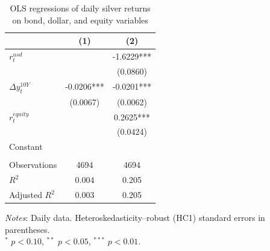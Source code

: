 \begin{table}[H]
\centering
\caption{OLS regressions of daily silver returns on bond, dollar, and equity variables}
\label{tab:ols_silver_bond}
\begin{tabular}{lcc}
\toprule
 & (1) & (2) \\
\midrule
$r^{usd}_t$ &  & -1.6229*** \\
 &  & (0.0860) \\
$\Delta y^{10Y}_t$ & -0.0206*** & -0.0201*** \\
 & (0.0067) & (0.0062) \\
$r^{equity}_t$ &  & 0.2625*** \\
 &  & (0.0424) \\
Constant &  &  \\
 &  &  \\
Observations & 4694 & 4694 \\
$R^2$ & 0.004 & 0.205 \\
Adjusted $R^2$ & 0.003 & 0.205 \\
\bottomrule
\end{tabular}

\vspace{0.2cm}
\begin{minipage}{0.9\textwidth}
\footnotesize
\textit{Notes}: Daily data. Heteroskedasticity--robust (HC1) standard errors in parentheses.\\
$^*$ $p<0.10$, $^{**}$ $p<0.05$, $^{***}$ $p<0.01$.
\end{minipage}
\end{table}
